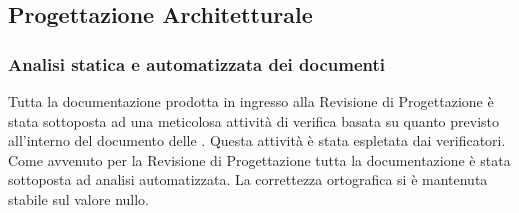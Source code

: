 \newpage
\subsection{Progettazione Architetturale} 

\subsubsection{Analisi statica e automatizzata dei documenti}\label{resocontoProgettazione}
Tutta la documentazione prodotta in ingresso alla Revisione di Progettazione è stata sottoposta ad una meticolosa attività di verifica
basata su quanto previsto all'interno del documento delle .
Questa attività è stata espletata dai verificatori.
Come avvenuto per la Revisione di Progettazione tutta la documentazione è stata sottoposta ad analisi automatizzata.
La correttezza ortografica si è mantenuta stabile sul valore nullo.

